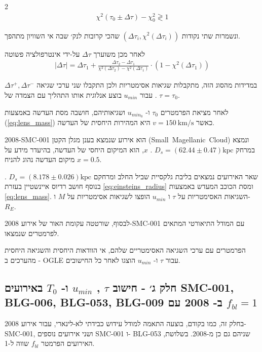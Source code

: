 \documentclass{article}
\begin{document}
\begin{multicols}{2}
\begin{align}
    \chi^2(\tau_0\pm\Delta \tau) - \chi^2_0  \gtrless  1 
\end{align}


ונשמרות שתי נקודות
$(\Delta\tau_i,\chi^2(\Delta\tau_i))$
שהכי קרובות לנק׳ שבה אי השוויון מתהפך.

לאחר מכן משוערך 
$\Delta \tau$
על-ידי אינטרפולציה פשוטה 
\begin{align}
    |\Delta \tau| =  \Delta\tau_1 + \frac{\Delta\tau_2-\Delta\tau_1}{\chi^2(\Delta\tau_2)-\chi^2(\Delta\tau_1)}\cdot(1-\chi^2(\Delta\tau_1))
\end{align}

במדידות מהסוג הזה, מתקבלות שגיאות אסימטריות
ולכן התקבלו שני ערכי שגיאה 
$\Delta \tau ^+, \Delta \tau ^-$
.
עבור 
$u_{min}$
בוצע אנלוגית אותו התהליך עם הצמדה של 
$\tau=\tau_0$.

לאחר מציאת הפרמטרים 
$\tau_0$
ו-
$u_{min_0}$
ושגיאותיהם,
חושבה מסת העדשה באמצעות
(\ref{eq:lens_mass})
כאשר
$v=150 \:\text{km/s}$ 
היא המהירות היחסית של העדשה.

\mbox{2008-SMC-001} 
הוא אירוע שנמצא בענן מגלן הקטן
\mbox{(\textenglish{Small Magellanic Cloud})}
ונמצא במרחק
\mbox{$D_s=(62.44\pm 0.47)\text{kpc}$}
\cite{smc_distance}.
$x$,
הוא המיקום היחסי של העדשה,
בהיעדר מידע על מיקום העדשה נהוג להניח 
$x=0.5$.

שאר האירועים נמצאים בליבת גלקסיית שביל החלב ומרחקם
\mbox{$D_s=(8.178\pm 0.026)\text{kpc}$}
\cite{blg_distance}.
בנוסף חושב רדיוס איינשטיין בעזרת
\ref{eq:einsteins_radius}
ומסת הכוכב המעדש באמצעות
\ref{eq:lens_mass}.
השגיאות האסימטריות על
$\tau$
ו
$u_{min}$
הופצו לשגיאות אסימטריות על 
$M$
ו-
$R_E$.

לבסוף, שורטטה עקומת האור של אירוע
2008-SMC-001
עם המודל התיאורטי המתאים לפרמטרים שנמצאו.


הפרמטרים עם ערכי השגיאה האסימטריים שלהם, אי הוודאות היחסית והשגיאה היחסית מהערכים ב
-
OGLE 
עבור 
$\tau$
ו-
$u_{min}$
הוצגו לאחר כל החישובים.



\subsection{
חלק ג׳
-
חישוב
$\tau$
,
$u_{min}$
ו-
$T_0$
באירועים
\mbox{SMC-001},
\mbox{BLG-006},
\mbox{BLG-053},
\mbox{BLG-009}
ב-
2008
עם
$f_{bl}=1$
}
\label{subsec:2.3}

בחלק זה, כמו בקודם, בוצעה התאמה למודל עידוש כבידתי לא-לינארי,
עבור אירוע
2008-SMC-001,
ושני אירועים נוספים
SMC-001
ו-
BLG-053
,שניהם גם כן מ-2008.
בשלושת האירועים הפרמטר 
$f_{bl}$
שווה ל-1.


\end{multicols}
\end{document}
